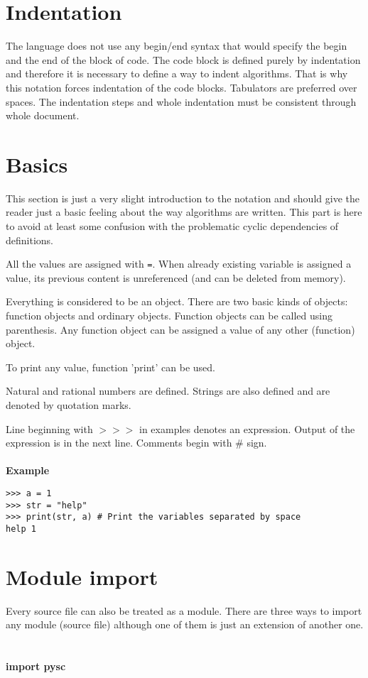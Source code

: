 \documentclass[11pt,oneside]{fithesis2}
\newcommand{\markit}[1]{\ \\\\{\noindent\textbf{#1}}}
\newcommand{\T}[1]{\texttt{#1}}
\begin{document}
\section{Indentation}
The language does not use any begin/end syntax that would specify the begin and the end of the block of code. The code block is defined purely by indentation and therefore it is necessary to define a way to indent algorithms. That is why this notation forces indentation of the code blocks. Tabulators are preferred over spaces. The indentation steps and whole indentation must be consistent through whole document.

\section{Basics}
This section is just a very slight introduction to the notation and should give the reader just a basic feeling about the way algorithms are written. This part is here to avoid at least some confusion with the problematic cyclic dependencies of definitions.

All the values are assigned with \T{=}. When already existing variable is assigned a value, its previous content is unreferenced (and can be deleted from memory).

Everything is considered to be an object. There are two basic kinds of objects: function objects and ordinary objects. Function objects can be called using parenthesis. Any function object can be assigned a value of any other (function) object.

To print any value, function 'print' can be used.

Natural and rational numbers are defined. Strings are also defined and are denoted by quotation marks.

Line beginning with $>>>$ in examples denotes an expression. Output of the expression is in the next line. Comments begin with \# sign.
\markit{Example}
\begin{lstlisting}
>>> a = 1
>>> str = "help"
>>> print(str, a) # Print the variables separated by space
help 1
\end{lstlisting}

\section{Module import}
Every source file can also be treated as a module. There are three ways to import any module (source file) although one of them is just an extension of another one.
\markit{import pysc}
\end{document}
